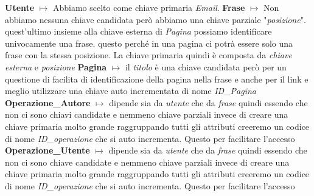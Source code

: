 \textbf{Utente} $\longmapsto$ Abbiamo scelto come chiave primaria \textit{Email}.\newline{}\newline{}
\textbf{Frase} $\longmapsto$ Non abbiamo nessuna chiave candidata però abbiamo una chiave parziale "\textit{posizione}". quest'ultimo insieme alla chiave esterna di \textit{Pagina} possiamo identificare univocamente una frase. questo perché in una pagina ci potrà essere solo una frase con la stessa posizione. La chiave primaria quindi è composta da \textit{chiave esterna} e \textit{posizione}\newline{}\newline{}
\textbf{Pagina} $\longmapsto$ il \textit{titolo} è una chiave candidata però per un questione di facilita di identificazione della pagina nella frase e anche per il link e meglio utilizzare una chiave auto incrementata di nome \textit{ID\_Pagina}\newline{}\newline{}
\textbf{Operazione\_Autore} $\longmapsto$ dipende sia da \textit{utente} che da \textit{frase} quindi essendo che non ci sono chiavi candidate e nemmeno chiave parziali invece di creare una chiave primaria molto grande raggruppando tutti gli attributi creeremo un codice di nome \textit{ID\_operazione} che si auto incrementa. Questo per facilitare l'accesso\newline{}\newline{}
\textbf{Operazione\_Utente} $\longmapsto$ dipende sia da \textit{utente} che da \textit{frase} quindi essendo che non ci sono chiave candidate e nemmeno chiave parziali invece di creare una chiave primaria molto grande raggruppando tutti gli attributi creeremo un codice di nome \textit{ID\_operazione} che si auto incrementa. Questo per facilitare l'accesso